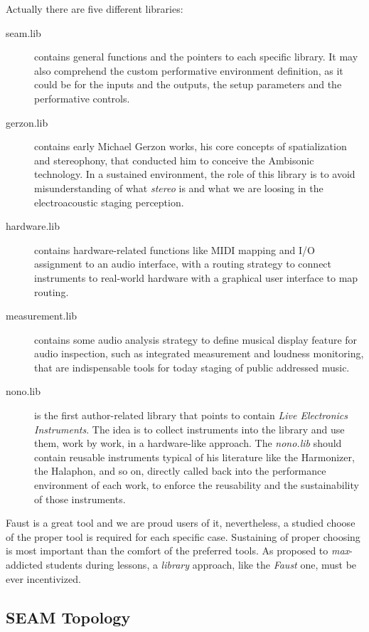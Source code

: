 \documentclass[twoside,a4paper]{article}
\begin{document}
Actually there are five different libraries:
\begin{description}
  \item[seam.lib] contains general functions and the pointers to each specific library. It may also comprehend the custom performative environment definition, as it could be for the inputs and the outputs, the setup parameters and the performative controls.
  \item[gerzon.lib] contains early Michael Gerzon works, his core concepts of spatialization and stereophony, that conducted him to conceive the Ambisonic technology. In a sustained environment, the role of this library is to avoid misunderstanding of what \emph{stereo} is \cite{ab58} and what we are loosing in the electroacoustic staging perception.
  \item[hardware.lib] contains hardware-related functions like MIDI mapping and I/O assignment to an audio interface, with a routing strategy to connect instruments to real-world hardware with a graphical user interface to map routing.
  \item[measurement.lib] contains some audio analysis strategy to define musical display feature for audio inspection, such as integrated measurement and loudness monitoring, that are indispensable tools for today staging of public addressed music.
  \item[nono.lib] is the first author-related library that points to contain \emph{Live Electronics Instruments}. The idea is to collect instruments into the library and use them, work by work, in a hardware-like approach. The \emph{nono.lib} should contain reusable instruments typical of his literature like the Harmonizer, the Halaphon, and so on, directly called back into the performance environment of each work, to enforce the reusability and the sustainability of those instruments.
\end{description}

Faust is a great tool and we are proud users of it, nevertheless, a studied choose of the proper tool is required for each specific case. Sustaining of proper choosing is most important than the comfort of the preferred tools. As proposed to \emph{max}-addicted students during lessons, a \emph{library} approach, like the \emph{Faust} one, must be ever incentivized.


\subsection{SEAM Topology}
\end{document}

